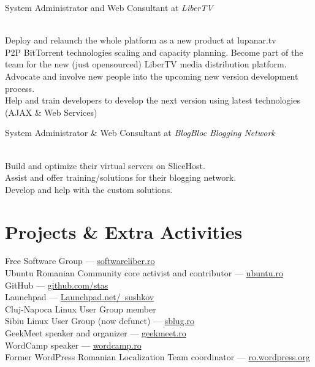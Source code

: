 \documentclass[10pt, a4paper]{article}
\newcommand{\years}[1]{\marginnote{\scriptsize #1}}
\begin{document}
\years{2008-2009}System Administrator and Web Consultant at \emph{LiberTV}
\begin{footnotesize}
\\
Deploy and relaunch the whole platform as a new product at lupanar.tv\\
P2P BitTorrent technologies scaling and capacity planning.
Become part of the team for the new (just opensourced) LiberTV media distribution platform.\\
Advocate and involve new people into the upcoming new version development process.\\
Help and train developers to develop the next version using latest technologies (AJAX \& Web Services)
\end{footnotesize}

\years{2008}System Administrator \& Web Consultant at \emph{BlogBloc Blogging Network}
\begin{footnotesize}
\\
Build and optimize their virtual servers on SliceHost.\\
Assist and offer training/solutions for their blogging network.\\
Develop and help with the custom solutions.
\end{footnotesize}

\pagebreak

\section*{Projects \& Extra Activities}
Free Software Group --- \href{http://softwareliber.ro}{softwareliber.ro}\\
Ubuntu Romanian Community core activist and contributor --- \href{http://ubuntu.ro}{ubuntu.ro}\\
GitHub --- \href{http://github.com/stas/}{github.com/stas}\\
Launchpad --- \href{http://launchpad.net/~sushkov}{Launchpad.net/~sushkov}\\
Cluj-Napoca Linux User Group member\\
Sibiu Linux User Group (now defunct) --- \href{http://sblug.ro}{sblug.ro}\\
GeekMeet speaker and organizer --- \href{http://geekmeet.ro}{geekmeet.ro}\\
WordCamp speaker --- \href{http://wordcamp.ro}{wordcamp.ro}\\
Former WordPress Romanian Localization Team coordinator --- \href{http://ro.wordpress.org}{ro.wordpress.org}\\
\end{document}
